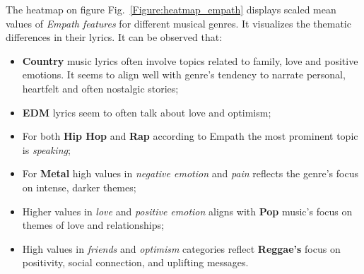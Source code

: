 The heatmap on figure Fig.~\ref{Figure:heatmap_empath} displays scaled mean
values of \textit{Empath features} for different musical genres. It visualizes
the thematic  differences in their lyrics. It can be observed that:
\begin{itemize}
  \item \textbf{Country} music lyrics often involve topics related to family,
    love and  positive emotions. It seems to align well with genre's tendency
    to narrate personal, heartfelt and often nostalgic stories;
  \item \textbf{EDM} lyrics seem to often talk about love and optimism;
  \item For both \textbf{Hip Hop} and \textbf{Rap} according to Empath  the
    most prominent topic is \textit{speaking};
  \item For \textbf{Metal} high values in \textit{negative emotion} and
    \textit{pain} reflects the genre's focus on intense, darker themes;
  \item Higher values in \textit{love} and \textit{positive emotion}
    aligns with \textbf{Pop} music’s focus on themes of love and relationships;
  \item High values in \textit{friends} and \textit{optimism} categories
    reflect \textbf{Reggae's} focus on positivity, social connection, and
    uplifting messages.
\end{itemize}

